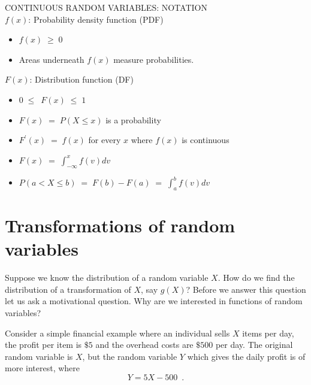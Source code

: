 {
\begin{framed}
CONTINUOUS RANDOM VARIABLES: NOTATION\\

$f(x)$: Probability density function (PDF)
\begin{itemize}
\item$f(x)\;\geq\;0$
\item Areas underneath $f(x)$ measure probabilities.
\end{itemize}

$F(x)$: Distribution function (DF)
\begin{itemize}
\item $0\;\leq\;\ F(x)\;\leq \;1$
\item $F(x)\;= \;P(X\leq x)$ is a probability
\item $F^{\prime}(x)\;=\;f(x)$ for every $x$ where $f(x)$ is continuous
\item $F(x)\;=\;\displaystyle\int^x_{-\infty}f(v)dv$
\item $P(a<X\leq b)\;=\;F(b)-F(a)\;=\;\displaystyle \int^b_af(v)dv$
\end{itemize}
\end{framed}
}


\remove{
\Exmp
}



\section{Transformations of random variables}\label{S:TransformationsOFRvs}

Suppose we know the distribution of a random variable $X$.  How do we find the distribution of a transformation of $X$, say $g(X)$?
Before we answer this question let us ask a motivational question.  Why are we interested in functions of random variables?

\begin{example}\label{EgProfitOn5With500cost}
Consider a simple financial example where an individual sells $X$ items per day, the profit per item is $\$ 5$ and the overhead costs are $\$ 500$ per day.  The original random variable is $X$, but the random variable $Y$ which gives the daily profit is of more interest, where
\[
Y = 5X - 500 \enspace . 
\]
\end{example}


